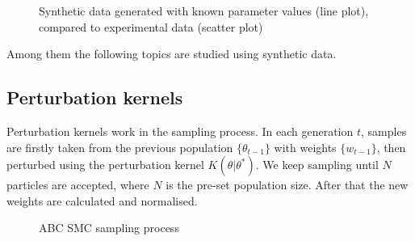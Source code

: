 \documentclass[12pt,a4paper]{report}
\begin{document}
\begin{figure}[h!]
    \begin{center}
    \end{center}
    
    \caption[Synthetic data generated with known parameter values]%
    {Synthetic data generated with known parameter values (line plot), compared to experimental data (scatter plot)} 
    \label{fig:infer_back_data}
    
\end{figure}

Among them the following topics are studied using synthetic data.

\subsection{Perturbation kernels}

Perturbation kernels work in the sampling process. In each generation $t$, samples are firstly taken from the previous population $\{\theta_{t-1}\}$ with weights $\{w_{t-1}\}$, then perturbed using the perturbation kernel $K(\theta|\theta^*)$. We keep sampling until $N$ particles are accepted, where $N$ is the pre-set population size. After that the new weights are calculated and normalised. 

\begin{figure}
    \begin{center}
    \end{center}
    
    \caption{ABC SMC sampling process} 
    \label{fig:smc}
    
\end{figure}
\end{document}
